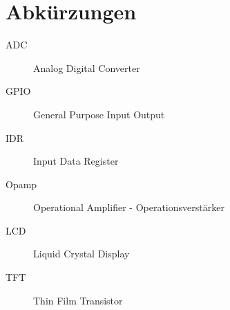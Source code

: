 \documentclass[a4paper,11pt,titlepage]{article}
\begin{document}


%
%
%
%
%
%
%
%
%
%


\tableofcontents
\thispagestyle{empty}
\clearpage

\setcounter{page}{3}
\section*{Abkürzungen}
\begin{description}
	\item[ADC]
	Analog Digital Converter
	
	\item[GPIO]
	General Purpose Input Output

	\item[IDR]
	Input Data Register
	
	\item[Opamp]
	Operational Amplifier - Operationsverstärker

	\item[LCD]
	Liquid Crystal Display

	\item[TFT]
	Thin Film Transistor
\end{description}
\clearpage

\setcounter{page}{1}

\end{document}
